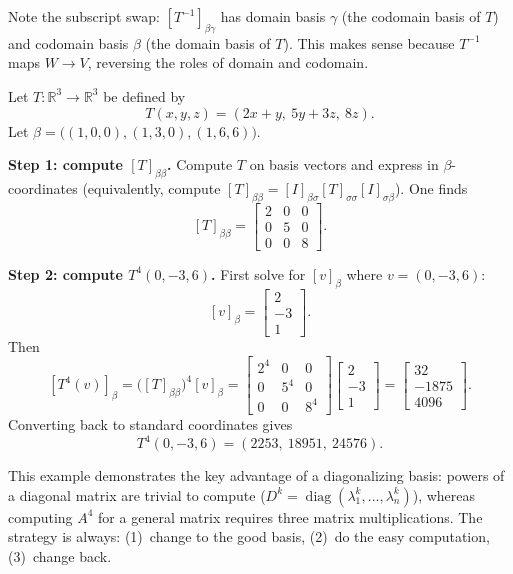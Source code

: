 Note the subscript swap: $[T^{-1}]_{\beta\gamma}$ has domain basis $\gamma$ (the codomain basis of $T$) and codomain basis $\beta$ (the domain basis of $T$).
This makes sense because $T^{-1}$ maps $W\to V$, reversing the roles of domain and codomain.

\begin{examplebox}[title={Worked Example (Lecture Week 7): using a "good basis" to simplify powers}]
Let $T:\mathbb{R}^3\to\mathbb{R}^3$ be defined by
\[
T(x,y,z)=(2x+y,\ 5y+3z,\ 8z).
\]
Let $\beta=\bigl((1,0,0),(1,3,0),(1,6,6)\bigr)$.

\textbf{Step 1: compute $[T]_{\beta\beta}$.}
Compute $T$ on basis vectors and express in $\beta$-coordinates (equivalently, compute $[T]_{\beta\beta}=[I]_{\beta\sigma}[T]_{\sigma\sigma}[I]_{\sigma\beta}$).
One finds
\[
[T]_{\beta\beta}=
\begin{bmatrix}
2&0&0\\
0&5&0\\
0&0&8
\end{bmatrix}.
\]

\textbf{Step 2: compute $T^4(0,-3,6)$.}
First solve for $[v]_\beta$ where $v=(0,-3,6)$:
\[
[v]_\beta=\begin{bmatrix}2\\-3\\1\end{bmatrix}.
\]
Then
\[
[T^4(v)]_\beta = \bigl([T]_{\beta\beta}\bigr)^4 [v]_\beta
=
\begin{bmatrix}
2^4&0&0\\
0&5^4&0\\
0&0&8^4
\end{bmatrix}
\begin{bmatrix}2\\-3\\1\end{bmatrix}
=
\begin{bmatrix}32\\-1875\\4096\end{bmatrix}.
\]
Converting back to standard coordinates gives
\[
T^4(0,-3,6)=(2253,\ 18951,\ 24576).
\]
\end{examplebox}

This example demonstrates the key advantage of a diagonalizing basis: powers of a diagonal matrix are trivial to compute ($D^k=\operatorname{diag}(\lambda_1^k,\dots,\lambda_n^k)$), whereas computing $A^4$ for a general matrix requires three matrix multiplications.
The strategy is always: (1)~change to the good basis, (2)~do the easy computation, (3)~change back.

